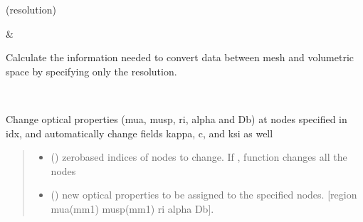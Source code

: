 \documentclass[letterpaper,10pt,english]{sphinxmanual}
\begin{document}
\begin{fulllineitems}
\begin{savenotes}
\begin{longtable}{}
\begin{varwidth}[t]{}
{\hyperref[\detokenize{_autosummary/nirfasterff.base.dcs_mesh.dcsmesh:nirfasterff.base.dcs_mesh.dcsmesh.voxelize}]{}}(resolution)
\sphinxbeforeendvarwidth
\end{varwidth}%
&\begin{varwidth}[t]{}
\sphinxAtStartPar
Calculate the information needed to convert data between mesh and volumetric space by specifying only the resolution.
\sphinxbeforeendvarwidth
\end{varwidth}%
\\
\sphinxbottomrule
\end{longtable}
\sphinxtableafterendhook
\sphinxatlongtableend
\end{savenotes}

\begin{fulllineitems}
\label{\detokenize{_autosummary/nirfasterff.base.dcs_mesh.dcsmesh:nirfasterff.base.dcs_mesh.dcsmesh.change_prop}}
\pysigstartsignatures
\pysiglinewithargsret
{}
{\sphinxparamcomma {}}
{}
\pysigstopsignatures
\sphinxAtStartPar
Change optical properties (mua, musp, ri, alpha and Db) at nodes specified in idx, and automatically change fields kappa, c, and ksi as well
\begin{quote}\begin{description}
\begin{itemize}
\item {} 
\sphinxAtStartPar
{} () \textendash{} zero\sphinxhyphen{}based indices of nodes to change. If , function changes all the nodes

\item {} 
\sphinxAtStartPar
{} () \textendash{} new optical properties to be assigned to the specified nodes. {[}region mua(mm\sphinxhyphen{}1) musp(mm\sphinxhyphen{}1) ri alpha Db{]}.


\end{itemize}
\end{description}
\end{quote}
\end{fulllineitems}
\end{fulllineitems}
\end{document}
